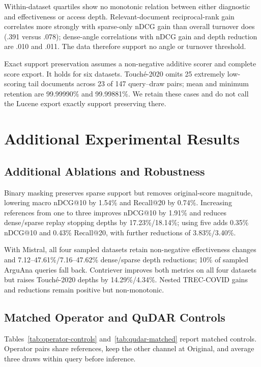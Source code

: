 Within-dataset quartiles show no monotonic relation between either diagnostic
and effectiveness or access depth. Relevant-document reciprocal-rank gain
correlates more strongly with sparse-only nDCG gain than overall turnover does
(.391 versus .078); dense-angle correlations with nDCG gain and depth reduction
are .010 and .011. The data therefore support no angle or turnover threshold.

Exact support preservation assumes a non-negative additive scorer and complete
score export. It holds for six datasets. Touch\'e-2020 omits 25 extremely
low-scoring tail documents across 23 of 147 query--draw pairs; mean and minimum
retention are 99.99990\% and 99.99881\%. We retain these cases and do not call
the Lucene export exactly support preserving there.

\section{Additional Experimental Results}
\label{sec:appendix-analysis}

\subsection{Additional Ablations and Robustness}
\label{sec:additional-results}

Binary masking preserves sparse support but removes original-score magnitude,
lowering macro nDCG@10 by 1.54\% and Recall@20 by 0.74\%. Increasing references
from one to three improves nDCG@10 by 1.91\% and reduces dense/sparse replay
stopping depths by 17.23\%/18.14\%; using five adds 0.35\% nDCG@10 and 0.43\%
Recall@20, with further reductions of 3.83\%/3.40\%.

With Mistral, all four sampled datasets retain non-negative effectiveness
changes and 7.12--47.61\%/7.16--47.62\% dense/sparse depth reductions; 10\% of
sampled ArguAna queries fall back. Contriever improves both metrics on all four
datasets but raises Touch\'e-2020 depths by 14.29\%/4.34\%. Nested TREC-COVID
gains and reductions remain positive but non-monotonic.

\subsection{Matched Operator and QuDAR Controls}

Tables~\ref{tab:operator-controls} and~\ref{tab:qudar-matched} report matched
controls. Operator pairs share references, keep the other channel at Original,
and average three draws within query before inference.

